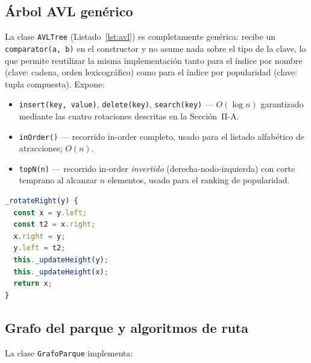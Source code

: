 \documentclass[conference]{IEEEtran}
\begin{document}
\subsection{\'Arbol AVL gen\'erico}

La clase \texttt{AVLTree} (Listado~\ref{lst:avl}) es completamente gen\'erica:
recibe un \texttt{comparator(a, b)} en el constructor y no asume nada sobre
el tipo de la clave, lo que permite reutilizar la misma implementaci\'on tanto
para el \'indice por nombre (clave: cadena, orden lexicogr\'afico) como para
el \'indice por popularidad (clave: tupla compuesta). Expone:

\begin{itemize}
  \item \texttt{insert(key, value)}, \texttt{delete(key)}, \texttt{search(key)}
    --- $O(\log n)$ garantizado mediante las cuatro rotaciones descritas en la
    Secci\'on~II-A.
  \item \texttt{inOrder()} --- recorrido in-order completo, usado para el
    listado alfab\'etico de atracciones; $O(n)$.
  \item \texttt{topN(n)} --- recorrido in-order \emph{invertido}
    (derecha-nodo-izquierda) con corte temprano al alcanzar $n$ elementos,
    usado para el ranking de popularidad.
\end{itemize}

\begin{lstlisting}[language=JavaScript, caption={Rotaci\'on simple derecha (caso Izquierda-Izquierda) del AVL.}, label={lst:avl}]
_rotateRight(y) {
  const x = y.left;
  const t2 = x.right;
  x.right = y;
  y.left = t2;
  this._updateHeight(y);
  this._updateHeight(x);
  return x;
}
\end{lstlisting}

\subsection{Grafo del parque y algoritmos de ruta}

La clase \texttt{GrafoParque} implementa:
\end{document}
